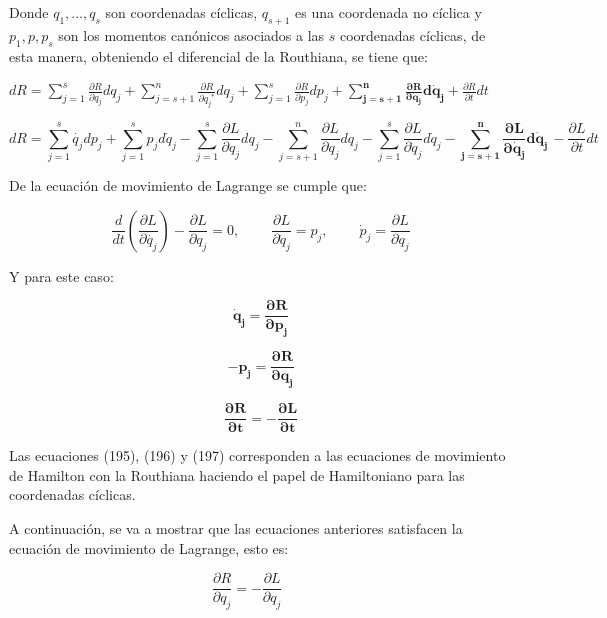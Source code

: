 \documentclass[]{article}
\begin{document}
Donde \(q_{1},\ldots,q_{s}\) son coordenadas cíclicas, \(q_{s + 1}\) es
una coordenada no cíclica y \(p_{1},p,p_{s}\) son los momentos canónicos
asociados a las \(s\) coordenadas cíclicas, de esta manera, obteniendo
el diferencial de la Routhiana, se tiene que:

\(dR = \sum_{j = 1}^{s}{\frac{\partial R}{\partial q_{j}}dq_{j}} + \sum_{j = s + 1}^{n}{\frac{\partial R}{\partial q_{j}^{\ \ *}}dq_{j}} + \sum_{j = 1}^{s}{\frac{\partial R}{\partial p_{j}}dp_{j}} + \sum_{\mathbf{j = s + 1}}^{\mathbf{n}}{\frac{\mathbf{\partial R}}{\mathbf{\partial}{\dot{\mathbf{q}}}_{\mathbf{j}}^{\mathbf{\ \ }}}\mathbf{d}{\dot{\mathbf{q}}}_{\mathbf{j}}} + \frac{\partial R}{\partial t}dt\)

\[dR = \sum_{j = 1}^{s}{\dot{q_{j}}dp_{j}} + \sum_{j = 1}^{s}{p_{j}d{\dot{q}}_{j}} - \sum_{j = 1}^{s}\frac{\partial L}{\partial q_{j}}dq_{j} - \sum_{j = s + 1}^{n}\frac{\partial L}{\partial q_{j}}dq_{j} - \sum_{j = 1}^{s}\frac{\partial L}{\partial{\dot{q}}_{j}}d{\dot{q}}_{j} - \sum_{\mathbf{j = s + 1}}^{\mathbf{n}}\frac{\mathbf{\partial L}}{\mathbf{\partial}{\dot{\mathbf{q}}}_{\mathbf{j}}}\mathbf{d}{\dot{\mathbf{q}}}_{\mathbf{j\ }} - \frac{\partial L}{\partial t}dt\]

De la ecuación de movimiento de Lagrange se cumple que:

\[\frac{d}{dt}\left( \frac{\partial L}{\partial\dot{q_{j}}} \right) - \frac{\partial L}{\partial q_{j}} = 0,\ \ \ \ \ \ \ \ \ \ \frac{\partial L}{\partial{\dot{q}}_{j}} = p_{j},\ \ \ \ \ \ \ \ \ \ {\dot{p}}_{j} = \frac{\partial L}{\partial q_{j}}\]

Y para este caso:

\[{\dot{\mathbf{q}}}_{\mathbf{j}}\mathbf{=}\frac{\mathbf{\partial R}}{\mathbf{\partial}\mathbf{p}_{\mathbf{j}}}\]

\[\mathbf{-}\mathbf{p}_{\mathbf{j}}\mathbf{=}\frac{\mathbf{\partial R}}{\mathbf{\partial}\mathbf{q}_{\mathbf{j}}}\]

\[\frac{\mathbf{\partial R}}{\mathbf{\partial t}}\mathbf{= -}\frac{\mathbf{\partial L}}{\mathbf{\partial t}}\]

Las ecuaciones (195), (196) y (197) corresponden a las ecuaciones de
movimiento de Hamilton con la Routhiana haciendo el papel de
Hamiltoniano para las coordenadas cíclicas.

A continuación, se va a mostrar que las ecuaciones anteriores satisfacen
la ecuación de movimiento de Lagrange, esto es:

\[\frac{\partial R}{\partial q_{j}} = - \frac{\partial L}{\partial q_{j}}\ \ \ \ \ \ \ \ \ \]
\end{document}
